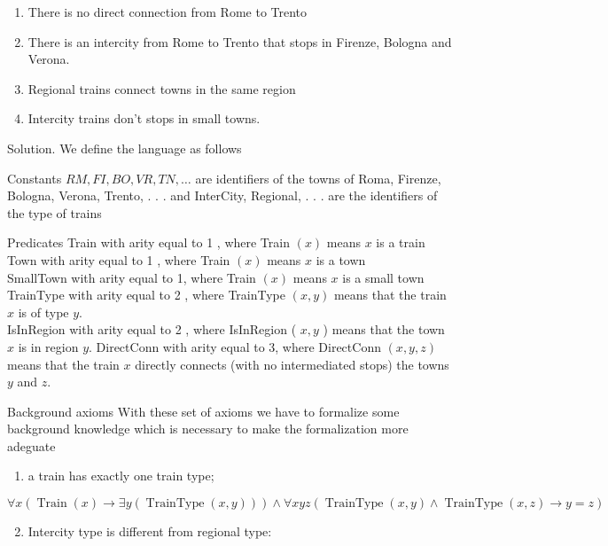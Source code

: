 \documentclass[10pt]{article}
\begin{document}
\begin{enumerate}
  \item There is no direct connection from Rome to Trento
  \item There is an intercity from Rome to Trento that stops in Firenze, Bologna and Verona.
  \item Regional trains connect towns in the same region
  \item Intercity trains don't stops in small towns.
\end{enumerate}

Solution. We define the language as follows

Constants $R M, F I, B O, V R, T N, \ldots$ are identifiers of the towns of Roma, Firenze, Bologna, Verona, Trento, . . . and InterCity, Regional, . . . are the identifiers of the type of trains

Predicates Train with arity equal to 1 , where Train $(x)$ means $x$ is a train Town with arity equal to 1 , where Train $(x)$ means $x$ is a town\\
SmallTown with arity equal to 1, where Train $(x)$ means $x$ is a small town TrainType with arity equal to 2 , where TrainType $(x, y)$ means that the train $x$ is of type $y$.\\
IsInRegion with arity equal to 2 , where IsInRegion ( $x, y$ ) means that the town $x$ is in region $y$. DirectConn with arity equal to 3, where DirectConn $(x, y, z)$ means that the train $x$ directly connects (with no intermediated stops) the towns $y$ and $z$.

Background axioms With these set of axioms we have to formalize some background knowledge which is necessary to make the formalization more adeguate

\begin{enumerate}
  \item a train has exactly one train type;
\end{enumerate}


\begin{equation*}
\forall x(\operatorname{Train}(x) \rightarrow \exists y(\operatorname{TrainType}(x, y))) \wedge \forall x y z(\operatorname{TrainType}(x, y) \wedge \operatorname{TrainType}(x, z) \rightarrow y=z) \tag{3.1}
\end{equation*}


\begin{enumerate}
  \setcounter{enumi}{1}
  \item Intercity type is different from regional type:
\end{enumerate}
\end{document}

